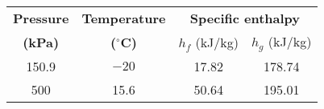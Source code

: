 \begin{table}[h!]
\centering
\begin{tabular}{|c|c|c|c|}
\hline
\textbf{Pressure} & \textbf{Temperature} & \multicolumn{2}{c|}{\textbf{Specific enthalpy}} \\ \cline{3-4} 
\textbf{(kPa)} & \textbf{($^\circ$C)} & $h_f$ (kJ/kg) & $h_g$ (kJ/kg) \\ \hline
150.9 & $-20$ & 17.82 & 178.74 \\ \hline
500 & 15.6 & 50.64 & 195.01 \\ \hline
\end{tabular}
\end{table}